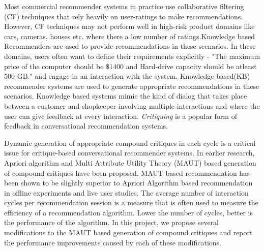 \abstract
\vspace*{24pt}

Most commercial recommender systems in practice use collaborative filtering (CF) techniques that rely heavily on user-ratings to make recommendations. 
However, CF techniques may not perform well in high-risk product domains like cars, cameras, houses etc. where there a low number of ratings.Knowledge based Recommenders are used to provide recommendations in these scenarios.
In these domains, users often want to define their requirements explicitly - "The maximum price of the computer should be \$1400 and Hard-drive capacity should be atleast 500 GB." and engage in an interaction with the system.
Knowledge based(KB) recommender systems are used to generate appropriate recommendations in these scenarios.
Knowledge based systems mimic the kind of dialog that takes place between a customer and shopkeeper involving multiple interactions and where the user can give feedback at every interaction.
\textit{Critiquing} is a popular form of feedback in conversational recommendation systems.

Dynamic generation of appropriate compound critiques in each cycle is a critical issue for critique-based conversational recommender systems.
In earlier research, Apriori algorithm and Multi Attribute Utility Theory (MAUT) based generation of compound critiques have been proposed.
MAUT based recommendation has been shown to be slightly superior to Apriori Algorithm based recommendation in offline experiments and live user studies.
The average number of interaction cycles per recommendation session is a measure that is often used to measure the efficiency of a recommendation algorithm. 
Lower the number of cycles, better is the performance of the algorithm. 
In this project, we propose several modifications to the MAUT based generation of compound critiques and report the performance improvements caused by each of these modifications.






